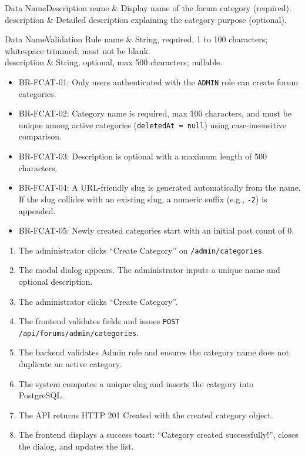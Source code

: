 
\begin{specdatatable}{Data Name}{Description}
name & Display name of the forum category (required).\\ \hline
description & Detailed description explaining the category purpose (optional).\\ \hline
\end{specdatatable}

\begin{specdatatable}{Data Name}{Validation Rule}
name & String, required, 1 to 100 characters; whitespace trimmed; must not be blank.\\ \hline
description & String, optional, max 500 characters; nullable.\\ \hline
\end{specdatatable}

\begin{itemize}[leftmargin=1.6em,topsep=3pt,itemsep=2pt,parsep=0pt,label=$\bullet$]\brrulelist
    \item BR-FCAT-01: Only users authenticated with the \texttt{ADMIN} role can create forum categories.
    \item BR-FCAT-02: Category name is required, max 100 characters, and must be unique among active categories (\texttt{deletedAt = null}) using case-insensitive comparison.
    \item BR-FCAT-03: Description is optional with a maximum length of 500 characters.
    \item BR-FCAT-04: A URL-friendly slug is generated automatically from the name. If the slug collides with an existing slug, a numeric suffix (e.g., \texttt{-2}) is appended.
    \item BR-FCAT-05: Newly created categories start with an initial post count of 0.
\end{itemize}

\begin{enumerate}[leftmargin=1.6em,topsep=3pt,itemsep=2pt,parsep=0pt]
    \item The administrator clicks ``Create Category'' on \texttt{/admin/categories}.
    \item The modal dialog appears. The administrator inputs a unique name and optional description.
    \item The administrator clicks ``Create Category''.
    \item The frontend validates fields and issues \texttt{POST /api/forums/admin/categories}.
    \item The backend validates Admin role and ensures the category name does not duplicate an active category.
    \item The system computes a unique slug and inserts the category into PostgreSQL.
    \item The API returns HTTP 201 Created with the created category object.
    \item The frontend displays a success toast: ``Category created successfully!'', closes the dialog, and updates the list.
\end{enumerate}

